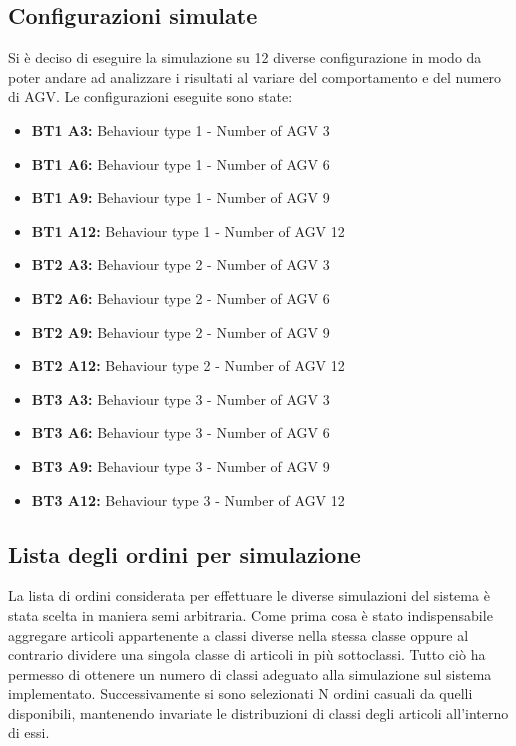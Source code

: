 \documentclass[12pt]{article}
\begin{document}
\subsection{Configurazioni simulate}
Si è deciso di eseguire la simulazione su 12 diverse configurazione in modo da poter andare ad analizzare i risultati al variare del comportamento e del numero di AGV. Le configurazioni eseguite sono state:
\begin{itemize}
\setlength\itemsep{0.1em}
    \item \textbf{BT1 A3:} Behaviour type 1 - Number of AGV 3 
    \item \textbf{BT1 A6:} Behaviour type 1 - Number of AGV 6 
    \item \textbf{BT1 A9:} Behaviour type 1 - Number of AGV 9
    \item \textbf{BT1 A12:} Behaviour type 1 - Number of AGV 12
    \vspace{0.3cm}
    \item \textbf{BT2 A3:} Behaviour type 2 - Number of AGV 3
    \item \textbf{BT2 A6:} Behaviour type 2 - Number of AGV 6 
    \item \textbf{BT2 A9:} Behaviour type 2 - Number of AGV 9 
    \item \textbf{BT2 A12:} Behaviour type 2 - Number of AGV 12 
    \vspace{0.3cm}
    \item \textbf{BT3 A3:} Behaviour type 3 - Number of AGV 3 
    \item \textbf{BT3 A6:} Behaviour type 3 - Number of AGV 6
    \item \textbf{BT3 A9:} Behaviour type 3 - Number of AGV 9 
    \item \textbf{BT3 A12:} Behaviour type 3 - Number of AGV 12 
    
\end{itemize}

\newpage

\subsection{Lista degli ordini per simulazione}
La lista di ordini considerata per effettuare le diverse simulazioni del sistema è stata scelta in maniera semi arbitraria. Come prima cosa è stato indispensabile aggregare articoli appartenente a classi diverse nella stessa classe oppure al contrario dividere una singola classe di articoli in più sottoclassi. Tutto ciò ha permesso di ottenere un numero di classi adeguato alla simulazione sul sistema implementato. \newline
Successivamente si sono selezionati N ordini casuali da quelli disponibili, mantenendo invariate le distribuzioni di classi degli articoli all'interno di essi.\\
\end{document}
